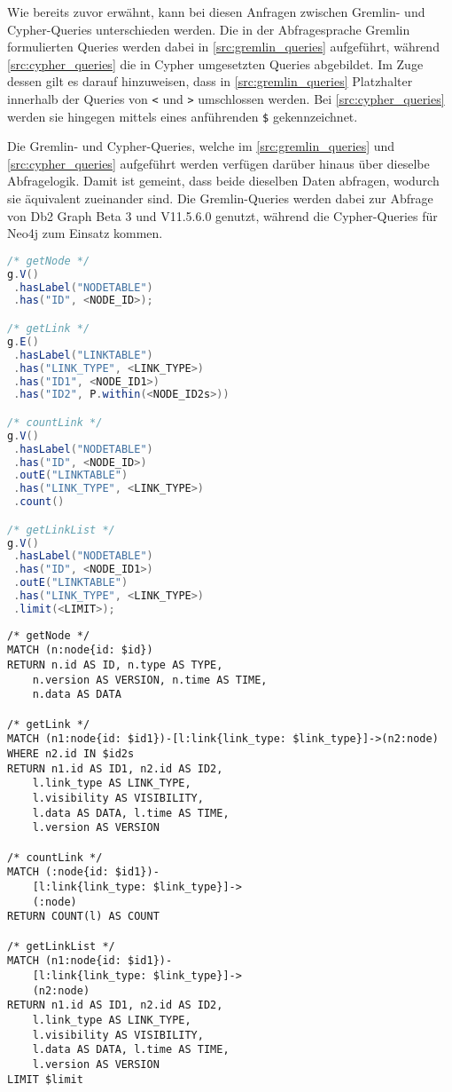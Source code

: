 Wie bereits zuvor erwähnt, kann bei diesen Anfragen zwischen Gremlin- und Cypher-Queries unterschieden werden. Die in der Abfragesprache Gremlin formulierten Queries werden dabei in \autoref{src:gremlin_queries} aufgeführt, während \autoref{src:cypher_queries} die in Cypher umgesetzten Queries abgebildet. Im Zuge dessen gilt es darauf hinzuweisen, dass in \autoref{src:gremlin_queries} Platzhalter innerhalb der Queries von \texttt{<} und \texttt{>} umschlossen werden. Bei \autoref{src:cypher_queries} werden sie hingegen mittels eines anführenden \texttt{\$} gekennzeichnet.

Die Gremlin- und Cypher-Queries, welche im \autoref{src:gremlin_queries} und \autoref{src:cypher_queries} aufgeführt werden verfügen darüber hinaus über dieselbe Abfragelogik. Damit ist gemeint, dass beide dieselben Daten abfragen, wodurch sie äquivalent zueinander sind. Die Gremlin-Queries werden dabei zur Abfrage von Db2 Graph Beta 3 und V11.5.6.0 genutzt, während die Cypher-Queries für Neo4j zum Einsatz kommen. 

\begin{lstlisting}[label=src:gremlin_queries,caption={Gremlin-Queries},language=Java]
/* getNode */
g.V()
 .hasLabel("NODETABLE")
 .has("ID", <NODE_ID>);

/* getLink */
g.E()
 .hasLabel("LINKTABLE")
 .has("LINK_TYPE", <LINK_TYPE>)
 .has("ID1", <NODE_ID1>)
 .has("ID2", P.within(<NODE_ID2s>))

/* countLink */
g.V()
 .hasLabel("NODETABLE")
 .has("ID", <NODE_ID>)
 .outE("LINKTABLE")
 .has("LINK_TYPE", <LINK_TYPE>)
 .count()

/* getLinkList */
g.V()
 .hasLabel("NODETABLE")
 .has("ID", <NODE_ID1>)
 .outE("LINKTABLE")
 .has("LINK_TYPE", <LINK_TYPE>)
 .limit(<LIMIT>);
\end{lstlisting}

\begin{lstlisting}[label=src:cypher_queries,caption={Cypher-Queries},language=CQL]
/* getNode */
MATCH (n:node{id: $id}) 
RETURN n.id AS ID, n.type AS TYPE, 
    n.version AS VERSION, n.time AS TIME, 
    n.data AS DATA

/* getLink */
MATCH (n1:node{id: $id1})-[l:link{link_type: $link_type}]->(n2:node) 
WHERE n2.id IN $id2s 
RETURN n1.id AS ID1, n2.id AS ID2, 
    l.link_type AS LINK_TYPE, 
    l.visibility AS VISIBILITY, 
    l.data AS DATA, l.time AS TIME, 
    l.version AS VERSION

/* countLink */
MATCH (:node{id: $id1})-
    [l:link{link_type: $link_type}]->
    (:node) 
RETURN COUNT(l) AS COUNT

/* getLinkList */
MATCH (n1:node{id: $id1})-
    [l:link{link_type: $link_type}]->
    (n2:node) 
RETURN n1.id AS ID1, n2.id AS ID2, 
    l.link_type AS LINK_TYPE, 
    l.visibility AS VISIBILITY, 
    l.data AS DATA, l.time AS TIME, 
    l.version AS VERSION 
LIMIT $limit
\end{lstlisting}


